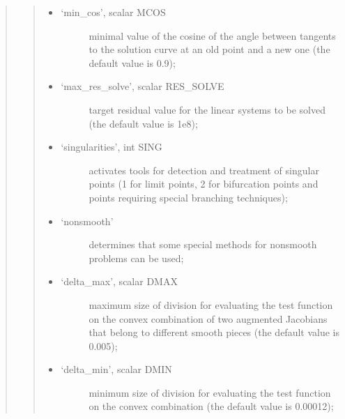 \documentclass[a4paper,11pt,english]{sphinxmanual}
\begin{document}
\begin{quote}
\begin{quote}
\begin{itemize}
\begin{description}
\end{description}

\item {} \begin{description}
\item[{‘min\_cos’, scalar MCOS}] \leavevmode
\sphinxAtStartPar
minimal value of the cosine of the angle between tangents to the
solution curve at an old point and a new one (the default value is
0.9);

\end{description}

\item {} \begin{description}
\item[{‘max\_res\_solve’, scalar RES\_SOLVE}] \leavevmode
\sphinxAtStartPar
target residual value for the linear systems to be solved (the
default value is 1e\sphinxhyphen{}8);

\end{description}

\item {} \begin{description}
\item[{‘singularities’, int SING}] \leavevmode
\sphinxAtStartPar
activates tools for detection and treatment of singular points (1 for
limit points, 2 for bifurcation points and points requiring special
branching techniques);

\end{description}

\item {} \begin{description}
\item[{‘non\sphinxhyphen{}smooth’}] \leavevmode
\sphinxAtStartPar
determines that some special methods for non\sphinxhyphen{}smooth problems can be
used;

\end{description}

\item {} \begin{description}
\item[{‘delta\_max’, scalar DMAX}] \leavevmode
\sphinxAtStartPar
maximum size of division for evaluating the test function on the
convex combination of two augmented Jacobians that belong to different
smooth pieces (the default value is 0.005);

\end{description}

\item {} \begin{description}
\item[{‘delta\_min’, scalar DMIN}] \leavevmode
\sphinxAtStartPar
minimum size of division for evaluating the test function on the
convex combination (the default value is 0.00012);


\end{description}
\end{itemize}
\end{quote}
\end{quote}
\end{document}
